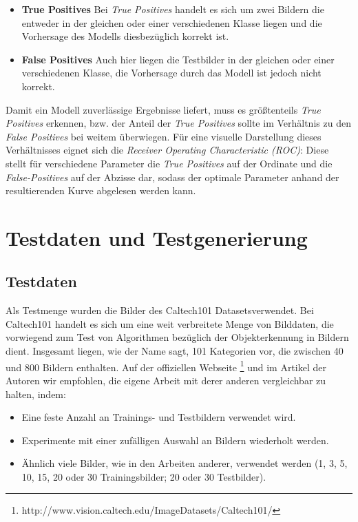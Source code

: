\begin{itemize}
	\item \textbf{True Positives} Bei \textit{True Positives} handelt es sich um zwei Bildern die entweder in der gleichen oder einer verschiedenen Klasse liegen und die Vorhersage des Modells diesbezüglich korrekt ist.
	\item \textbf{False Positives} Auch hier liegen die Testbilder in der gleichen oder einer verschiedenen Klasse, die Vorhersage durch das Modell ist jedoch nicht korrekt.
\end{itemize}

Damit ein Modell zuverlässige Ergebnisse liefert, muss es größtenteils \textit{True Positives} erkennen, bzw. der Anteil der \textit{True Positives} sollte im Verhältnis zu den \textit{False Positives} bei weitem überwiegen. Für eine visuelle Darstellung dieses Verhältnisses eignet sich die \textit{Receiver Operating Characteristic (ROC)}: Diese stellt für verschiedene Parameter die \textit{True Positives} auf der Ordinate und die \textit{False-Positives} auf der Abzisse dar, sodass der optimale Parameter anhand der resultierenden Kurve abgelesen werden kann.

\section{Testdaten und Testgenerierung}

\subsection{Testdaten}

Als Testmenge wurden die Bilder des Caltech101 \glqq Datasets\grqq verwendet. Bei Caltech101 handelt es sich um eine weit verbreitete Menge von Bilddaten, die vorwiegend zum Test von Algorithmen bezüglich der Objekterkennung in Bildern dient. Insgesamt liegen, wie der Name sagt, 101 Kategorien vor, die zwischen 40 und 800 Bildern enthalten. Auf der offiziellen Webseite \footnote{http://www.vision.caltech.edu/Image\textunderscore Datasets/Caltech101/} und im Artikel der Autoren wir empfohlen, die eigene Arbeit mit derer anderen vergleichbar zu halten, indem:

\begin{itemize}
	\item Eine feste Anzahl an Trainings- und Testbildern verwendet wird.
	\item Experimente mit einer zufälligen Auswahl an Bildern wiederholt werden.
	\item Ähnlich viele Bilder, wie in den Arbeiten anderer, verwendet werden (1, 3, 5, 10, 15, 20 oder 30 Trainingsbilder; 20 oder 30 Testbilder).
\end{itemize}

